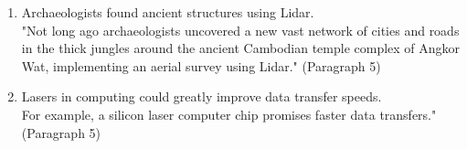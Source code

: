 \documentclass[12pt, a4paper]{report}
\begin{document}
\begin{enumerate}
    \item Archaeologists found ancient structures using Lidar. \\
          "Not long ago archaeologists uncovered a new vast network of cities and
          roads in the thick jungles around the ancient Cambodian temple complex
          of Angkor Wat, implementing an aerial survey using Lidar." (Paragraph 5)
    \item Lasers in computing could greatly improve data transfer speeds. \\
          For example, a silicon laser computer chip promises faster data
          transfers." (Paragraph 5)
\end{enumerate} \leavevmode\newline

\end{document}
